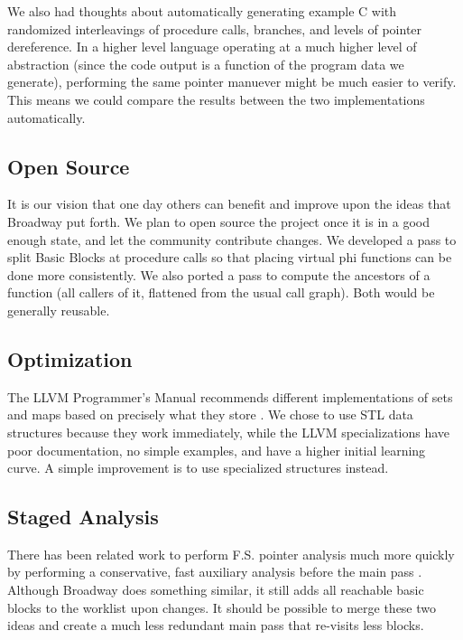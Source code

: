 We also had thoughts about automatically generating example C with randomized
interleavings of procedure calls, branches, and levels of pointer dereference.
In a higher level language operating at a much higher level of abstraction
(since the code output is a function of the program data we generate),
performing the same pointer manuever might be much easier to verify. This means
we could compare the results between the two implementations automatically.

\subsection{Open Source}

It is our vision that one day others can benefit and improve upon the ideas that
Broadway put forth. We plan to open source the project once it is in a good
enough state, and let the community contribute changes. We developed a pass to
split Basic Blocks at procedure calls so that placing virtual phi functions can
be done more consistently. We also ported a pass to compute the ancestors of a
function (all callers of it, flattened from the usual call graph). Both would be
generally reusable.

\subsection{Optimization}

The LLVM Programmer's Manual recommends different implementations of sets and
maps based on precisely what they store \cite{llvmprogdoc}. We chose to use STL
data structures because they work immediately, while the LLVM specializations
have poor documentation, no simple examples, and have a higher initial learning
curve. A simple improvement is to use specialized structures instead.

\subsection{Staged Analysis}

There has been related work to perform F.S. pointer analysis much more quickly
by performing a conservative, fast auxiliary analysis before the main pass
\cite{cc06}.  Although Broadway does something similar, it still adds all
reachable basic blocks to the worklist upon changes. It should be possible to
merge these two ideas and create a much less redundant main pass that re-visits
less blocks.


